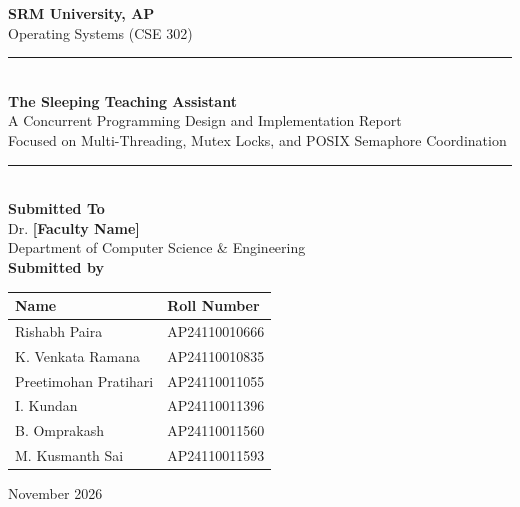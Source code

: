 \documentclass[12pt,a4paper]{report}
\begin{document}
\begin{titlepage}
  \centering
  \vspace*{0.4cm}
  {\Large\bfseries SRM University, AP}\\[0.25cm]
  {\large Operating Systems (CSE 302)}\\[1.4cm]

  \rule{\linewidth}{1pt}\\[0.5cm]
  {\LARGE\bfseries The Sleeping Teaching Assistant}\\[0.35cm]
  {\large A Concurrent Programming Design and Implementation Report}\\[0.2cm]
  {\normalsize Focused on Multi-Threading, Mutex Locks, and POSIX Semaphore Coordination}\\[0.5cm]
  \rule{\linewidth}{1pt}\\[2.0cm]

  {\large\textbf{Submitted To}}\\[0.5cm]
  {\large Dr. \textbf{[Faculty Name]}}\\[0.3cm]
  {\normalsize Department of Computer Science \& Engineering}\\[1.6cm]

  {\large\textbf{Submitted by}}\\[0.6cm]

  \begin{tabular}{ll}
    \toprule
    \textbf{Name} & \textbf{Roll Number} \\
    \midrule
    Rishabh Paira         & AP24110010666 \\
    K. Venkata Ramana     & AP24110010835 \\
    Preetimohan Pratihari & AP24110011055 \\
    I. Kundan             & AP24110011396 \\
    B. Omprakash          & AP24110011560 \\
    M. Kusmanth Sai       & AP24110011593 \\
    \bottomrule
  \end{tabular}

  \vfill
  {\large November 2026}
\end{titlepage}

\end{document}
